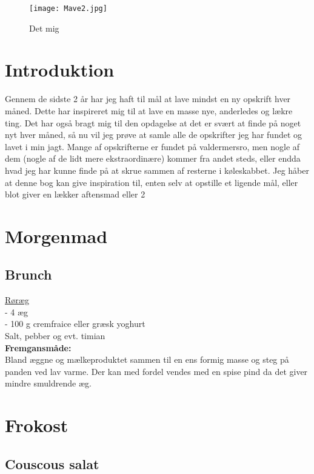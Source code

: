 \documentclass{book}
\begin{document}
{\begin{figure}
    \centering
    \texttt{[image: Mave2.jpg]}
    \caption{Det mig}
    \label{fig:enter-label}
\end{figure}
\newpage \tableofcontents
\mainmatter
\newpage\chapter{Introduktion} \doublespacing
Gennem de sidste 2 år har jeg haft til mål at lave mindst en ny opskrift hver måned. Dette har inspireret mig til at lave en masse nye, anderledes og lækre ting. Det har også bragt mig til den opdagelse at det er svært at finde på noget nyt hver måned, så nu vil jeg prøve at samle alle de opskrifter jeg har fundet og lavet i min jagt. Mange af opskrifterne er fundet på valdermersro, men nogle af dem (nogle af de lidt mere ekstraordinære) kommer fra andet steds, eller endda hvad jeg har kunne finde på at skrue sammen af resterne i køleskabbet. Jeg håber at denne bog kan give inspiration til, enten selv at opstille et ligende mål, eller blot giver en lækker aftensmad eller 2\text{;)} 
\singlespacing
\chapter{Morgenmad}
\section{Brunch}
\underline{Røræg}
\\ - 4 æg
\\ - 100 g cremfraice eller græsk yoghurt
\\ Salt, pebber og evt. timian
\\ \textbf{Fremgansmåde:}
\\ Bland æggne og mælkeproduktet sammen til en ens formig masse og steg på panden ved lav varme. Der kan med fordel vendes med en spise pind da det giver mindre smuldrende æg.


\chapter{Frokost} 
\section{Couscous salat}
\begin{minipage}[t]{0.5\textwidth}
\end{minipage}
\begin{minipage}[t]{0.5\textwidth}
\end{minipage}
}
\end{document}
